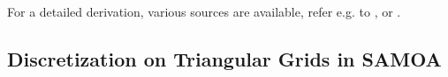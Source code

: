 For a detailed derivation, various sources are available, refer e.g. to \cite{samfass14extension}, \cite{cui} or \cite{fuchs}.  


\subsection{Discretization on Triangular Grids in SAMOA}
